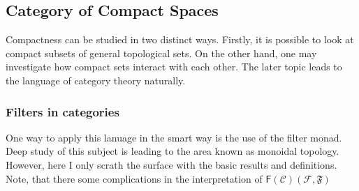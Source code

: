 \documentclass[12pt]{scrartcl}
\renewcommand{\.}{\; . \;}
\newcommand{\C}{\mathcal{C}}
\newcommand{\FILT}{\mathsf{F}}
\newcommand{\F}{\mathcal{F}}
\begin{document}
\subsection{Category of Compact Spaces}
Compactness can be studied in two distinct ways.
Firstly, it is possible to look at compact subsets of general topological sets.
On the other hand, one  may investigate how compact sets interact with each other.
The later topic leads to the language of category theory naturally.
\subsubsection{Filters in categories}
One way to apply this lanuage in the smart way is the use of the filter monad.
Deep study of this subject is leading to the area known as monoidal topology.
However, here I only scrath the surface with the basic results and definitions.
Note, that there some complications in the interpretation of
$\FILT(\C)(\F,\mathfrak{F})$
\end{document}
